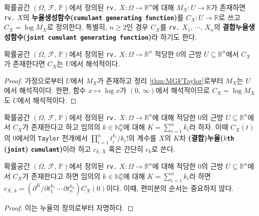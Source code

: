 \begin{definition}
    확률공간 $(\Omega,\,\mathcal{F},\,\mathbb{P})$에서 정의된 \texttt{rv.} $X:\Omega\to\mathbb{R}^n$에 대해 $M_X:U\to\mathbb{R}$가 존재하면 \texttt{rv.} $X$의 \textbf{누율생성함수(\texttt{cumulant generating function})}를 $C_X:U\to\mathbb{R}$로 쓰고 $C_X=\log M_X$로 정의한다. 특별히, $n\geq2$인 경우 $C_X$를 \texttt{rv.} $X_1,\,\cdots,\,X_n$의 \textbf{결합누율생성함수(\texttt{joint cumulant generating function})}라 하기도 한다.
\end{definition}

\begin{proposition}
    확률공간 $(\Omega,\,\mathcal{F},\,\mathbb{P})$에서 정의된 \texttt{rv.} $X:\Omega\to\mathbb{R}^n$ 적당한 $0$의 근방 $U\subseteq\mathbb{R}^n$에서 $C_X$가 존재한다면 $C_X$는 $U$에서 해석적이다.
\end{proposition}

\begin{proof}
    가정으로부터 $U$에서 $M_X$가 존재하고 정리 \ref{thm:MGFTaylor}로부터 $M_X$는 $U$에서 해석적이다. 한편, 함수 $x\mapsto\log x$가 $(0,\,\infty)$에서 해석적이므로 $C_X=\log M_X$도 $U$에서 해석적이다.
\end{proof}

\begin{definition}
    확률공간 $(\Omega,\,\mathcal{F},\,\mathbb{P})$에서 정의된 \texttt{rv.} $X:\Omega\to\mathbb{R}^n$에 대해 적당한 $0$의 근방 $U\subseteq\mathbb{R}^n$에서 $C_X$가 존재한다고 하고 임의의 $k\in\mathbb{N}_0^n$에 대해 $K=\sum_{i=1}^nk_i$라 하자. 이때 $C_X(t)$의 $0$에서의 \texttt{Taylor} 전개에서 $\prod_{i=1}^nt_i^{k_i}/k_i!$의 계수를 $X$의 $K$차 \textbf{(결합)누율($k$\texttt{th} (\texttt{joint}) \texttt{cumulant})}이라 하고 $c_{k,\,X}$ 혹은 간단히 $c_k$로 쓴다.
\end{definition}

\begin{theorem}
    확률공간 $(\Omega,\,\mathcal{F},\,\mathbb{P})$에서 정의된 \texttt{rv.} $X:\Omega\to\mathbb{R}^n$에 대해 적당한 $0$의 근방 $U\subseteq\mathbb{R}^n$에서 $C_X$가 존재한다고 하면 임의의 $k\in\mathbb{N}_0^n$에 대해 $K=\sum_{i=1}^nk_i$라 하면 $c_{X,\,k}=(\partial^K/\partial t_1^{k_1}\,\cdots\,\partial t_n^{k_n})C_X(0)$이다. 이때, 편미분의 순서는 중요하지 않다.
\end{theorem}

\begin{proof}
    이는 누율의 정의로부터 자명하다.
\end{proof}


